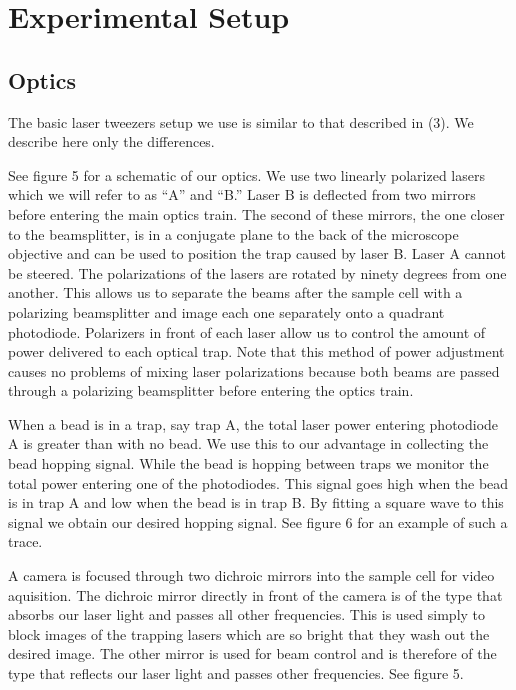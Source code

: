 \documentclass{report}
\begin{document}
\chapter{Experimental Setup}

\section{Optics}

The basic laser tweezers setup we use is similar to that described in (3). We describe here only the differences.

See figure 5 for a schematic of our optics. We use two linearly polarized lasers which we will refer to as ``A'' and ``B.'' Laser B is deflected from two mirrors before entering the main optics train. The second of these mirrors, the one closer to the beamsplitter, is in a conjugate plane to the back of the microscope objective and can be used to position the trap caused by laser B. Laser A cannot be steered. The polarizations of the lasers are rotated by ninety degrees from one another. This allows us to separate the beams after the sample cell with a polarizing beamsplitter and image each one separately onto a quadrant photodiode. Polarizers in front of each laser allow us to control the amount of power delivered to each optical trap. Note that this method of power adjustment causes no problems of mixing laser polarizations because both beams are passed through a polarizing beamsplitter before entering the optics train.

When a bead is in a trap, say trap A, the total laser power entering photodiode A is greater than with no bead. We use this to our advantage in collecting the bead hopping signal. While the bead is hopping between traps we monitor the total power entering one of the photodiodes. This signal goes high when the bead is in trap A and low when the bead is in trap B. By fitting a square wave to this signal we obtain our desired hopping signal. See figure 6 for an example of such a trace.

A camera is focused through two dichroic mirrors into the sample cell for video aquisition. The dichroic mirror directly in front of the camera is of the type that absorbs our laser light and passes all other frequencies. This is used simply to block images of the trapping lasers which are so bright that they wash out the desired image. The other mirror is used for beam control and is therefore of the type that reflects our laser light and passes other frequencies. See figure 5.
\end{document}
